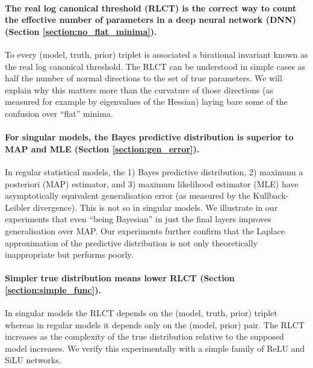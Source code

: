 \documentclass[11pt]{article}
\numberwithin{equation}{section}
\theoremstyle{plain}
\theoremstyle{definition}
\begin{document}
\paragraph{The real log canonical threshold (RLCT) is the correct way to count the effective number of parameters in a deep neural network (DNN) (Section \ref{section:no_flat_minima}). } 
To every (model, truth, prior) triplet is associated a birational invariant known as the real log canonical threshold. The RLCT can be understood in simple cases as half the number of normal directions to the set of true parameters. We will explain why this matters more than the curvature of those directions (as measured for example by eigenvalues of the Hessian) laying bare some of the confusion over ``flat'' minima. 

\paragraph{For singular models, the Bayes predictive distribution is superior to MAP and MLE (Section \ref{section:gen_error}). } In regular statistical models,  the 1) Bayes predictive distribution, 2) maximum {a posteriori} (MAP) estimator, and 3) maximum likelihood estimator (MLE) have asymptotically equivalent generalisation error (as measured by the Kullback-Leibler divergence). This is not so in singular models. We illustrate in our experiments that even ``being Bayesian'' in just the final layers improves generalisation over MAP. Our experiments further confirm that the Laplace approximation of the predictive distribution \citet{smith2017bayesian,zhang_energyentropy_2018} is not only theoretically inappropriate but performs poorly.

\paragraph{Simpler true distribution means lower RLCT (Section \ref{section:simple_func}).}  In singular models the RLCT depends on the (model, truth, prior) triplet whereas in regular models it depends only on the (model, prior) pair. The RLCT increases as the complexity of the true distribution relative to the supposed model increases. We verify this experimentally with a simple family of ReLU and SiLU networks. 
\end{document}
